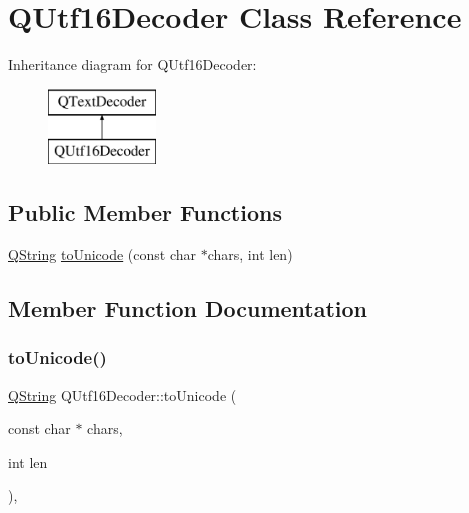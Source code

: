\hypertarget{class_q_utf16_decoder}{}\section{Q\+Utf16\+Decoder Class Reference}
\label{class_q_utf16_decoder}
Inheritance diagram for Q\+Utf16\+Decoder\+:\begin{figure}[H]
\begin{center}
\leavevmode
\includegraphics[height=2.000000cm]{class_q_utf16_decoder}
\end{center}
\end{figure}
\subsection*{Public Member Functions}
\begin{DoxyCompactItemize}
\item 
\mbox{\hyperlink{class_q_string}{Q\+String}} \mbox{\hyperlink{class_q_utf16_decoder_aa341683deb31e2670a369ee26058f6c4}{to\+Unicode}} (const char $\ast$chars, int len)
\end{DoxyCompactItemize}


\subsection{Member Function Documentation}
\mbox{\label{class_q_utf16_decoder_aa341683deb31e2670a369ee26058f6c4}} 
\subsubsection{\texorpdfstring{toUnicode()}{toUnicode()}}
{\footnotesize\ttfamily \mbox{\hyperlink{class_q_string}{Q\+String}} Q\+Utf16\+Decoder\+::to\+Unicode (\begin{DoxyParamCaption}\item[{const char $\ast$}]{chars,  }\item[{int}]{len }\end{DoxyParamCaption})\hspace{0.3cm}{\ttfamily [inline]}, {\ttfamily [virtual]}}


